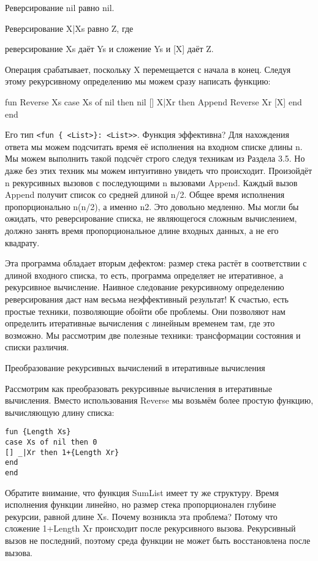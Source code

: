 Реверсирование nil равно nil.

Реверсирование X|Xs равно Z, где

реверсирование Xs даёт Ys и сложение Ys и [X] даёт Z.

Операция срабатывает, поскольку X перемещается с начала в конец. Следуя этому рекурсивному определению мы можем сразу написать функцию:

fun {Reverse Xs}
case Xs
of nil then nil
[] X|Xr then
{Append {Reverse Xr} [X]}
end
end

Его тип \lstinline|<fun { <List>}: <List>>|. Функция эффективна? Для нахождения ответа мы можем подсчитать время её исполнения на входном списке длины n. Мы можем выполнить такой подсчёт строго следуя техникам из Раздела 3.5. Но даже без этих техник мы можем интуитивно увидеть что происходит. Произойдёт n рекурсивных вызовов с последующими n вызовами Append. Каждый вызов Append получит список со средней длиной n/2. Общее время исполнения пропорционально n(n/2), а именно n2. Это довольно медленно. Мы могли бы ожидать, что реверсирование списка, не являющегося сложным вычислением, должно занять время пропорциональное длине входных данных, а не его квадрату.

Эта программа обладает вторым дефектом: размер стека растёт в соответствии с длиной входного списка, то есть, программа определяет не итеративное, а рекурсивное вычисление. Наивное следование рекурсивному определению реверсирования даст нам весьма неэффективный результат! К счастью, есть простые техники, позволяющие обойти обе проблемы. Они позволяют нам определить итеративные вычисления с линейным временем там, где это возможно. Мы рассмотрим две полезные техники: трансформации состояния и списки различия.

Преобразование рекурсивных вычислений в итеративные вычисления

Рассмотрим как преобразовать рекурсивные вычисления в итеративные вычисления. Вместо использования Reverse мы возьмём более простую функцию, вычисляющую длину списка:

\begin{lstlisting}
fun {Length Xs}
case Xs of nil then 0
[] _|Xr then 1+{Length Xr}
end
end
\end{lstlisting}

Обратите внимание, что функция SumList имеет ту же структуру. Время исполнения функции линейно, но размер стека пропорционален глубине рекурсии, равной длине Xs. Почему возникла эта проблема? Потому что сложение 1+{Length Xr} происходит после рекурсивного вызова. Рекурсивный вызов не последний, поэтому среда функции не может быть восстановлена после вызова.

